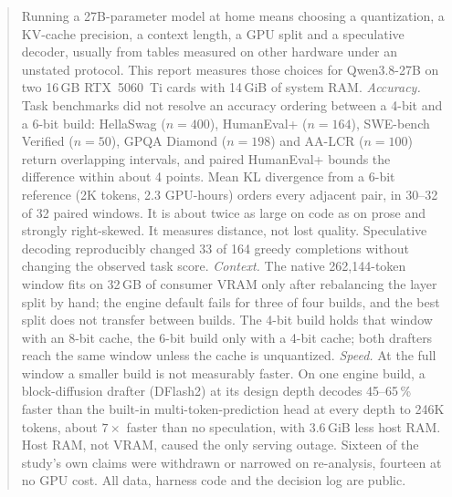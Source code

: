 \begin{abstract}
\noindent
Running a 27B-parameter model at home means choosing a quantization, a KV-cache precision, a context
length, a GPU split and a speculative decoder, usually from tables measured on other hardware
under an unstated protocol. This report measures those choices for Qwen3.8-27B on two 16\,GB
RTX~5060~Ti cards with 14\,GiB of system RAM.
\emph{Accuracy.} Task benchmarks did not resolve an accuracy ordering between a 4-bit and a 6-bit
build: HellaSwag ($n{=}400$), HumanEval+ ($n{=}164$), SWE-bench Verified ($n{=}50$), GPQA Diamond
($n{=}198$) and AA-LCR ($n{=}100$) return overlapping intervals, and paired HumanEval+ bounds the
difference within about 4 points. Mean KL divergence from a 6-bit reference (2K tokens, 2.3 GPU-hours) orders every adjacent pair, in 30--32 of 32 paired windows. It is about twice as large
on code as on prose and strongly right-skewed. It measures distance, not lost quality. Speculative
decoding reproducibly changed 33 of 164 greedy completions without changing the observed task score.
\emph{Context.} The native 262{,}144-token window fits on 32\,GB of consumer VRAM only after
rebalancing the layer split by hand; the engine default fails for three of four builds, and the best
split does not transfer between builds. The 4-bit build holds that window with an 8-bit cache, the
6-bit build only with a 4-bit cache; both drafters reach the same window unless the cache
is unquantized.
\emph{Speed.} At the full window a smaller build is not measurably faster. On one engine build, a
block-diffusion drafter (DFlash2) at its design depth decodes 45--65\,\% faster than the built-in
multi-token-prediction head at every depth to 246K tokens, about $7\times$ faster than no speculation,
with 3.6\,GiB less host RAM. Host RAM, not VRAM, caused the only serving outage.
Sixteen of the study's own claims were withdrawn or narrowed on re-analysis, fourteen at no GPU cost. All data, harness code and the decision log are public.
\end{abstract}
